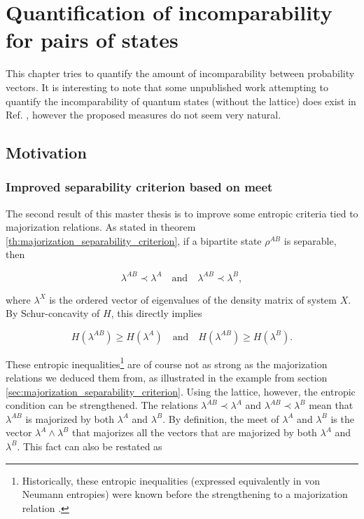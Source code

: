 \chapter{Quantification of incomparability for pairs of states} \label{chap:incomparability} \label{chap:criteria}

This chapter tries to quantify the amount of incomparability between probability vectors. It is interesting to note that some unpublished work attempting to quantify the incomparability of quantum states (without the lattice) does exist in Ref. \cite{hu_characterizing_2018}, however the proposed measures do not seem very natural.



\section{Motivation} \label{sec:incomparability_motivation}

\subsection{Improved separability criterion based on meet}

The second result of this master thesis is to improve some entropic criteria tied to majorization relations. As stated in theorem \ref{th:majorization_separability_criterion}, if a bipartite state $\rho^{AB}$ is separable, then

\begin{equation}
    \lambda^{AB} \prec \lambda^A \quad \text{and} \quad \lambda^{AB} \prec \lambda^{B},
\end{equation}

where $\lambda^X$ is the ordered vector of eigenvalues of the density matrix of system $X$. By Schur-concavity of $H$, this directly implies

\begin{equation}
    H(\lambda^{AB}) \geq H(\lambda^A) \quad \text{and} \quad H(\lambda^{AB}) \geq H(\lambda^B).
\end{equation}

These entropic inequalities\footnote{Historically, these entropic inequalities (expressed equivalently in von Neumann entropies) were known before the strengthening to a majorization relation \cite{cerf_negative_1997, nielsen_separable_2001}.} are of course not as strong as the majorization relations we deduced them from, as illustrated in the example from section \ref{sec:majorization_separability_criterion}. Using the lattice, however, the entropic condition can be strengthened. The relations $\lambda^{AB} \prec \lambda^A$ and $\lambda^{AB} \prec \lambda^{B}$ mean that $\lambda^{AB}$ is majorized by both $\lambda^A$ and $\lambda^B$. By definition, the meet of $\lambda^A$ and $\lambda^B$ is the vector $\lambda^A \wedge \lambda^B$ that majorizes all the vectors that are majorized by both $\lambda^A$ and $\lambda^B$. This fact can also be restated as 

